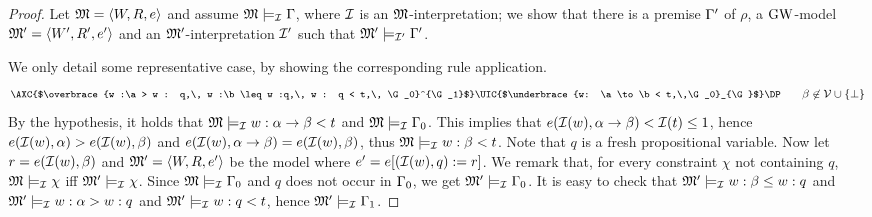 \begin{proof}
  Let $\mathfrak{M}=\langle W,R,e \rangle$ and assume $\mathfrak{M}\models_{\mathcal{I}}\Gamma$, where $\mathcal{I}$
  is an $\mathfrak{M}$-interpretation; we show that there is a premise $\Gamma'$ of
  $\rho$, a $\mbox{$\mathrm{GW}$}$-model $\mathfrak{M}'=\langle W',R',e' \rangle$ and an
  $\mathfrak{M}'$-interpretation $\mathcal{I}'$ such that $\mathfrak{M}'\models_{\mathcal{I}'}\Gamma'$.

  

  We only detail some representative case, by showing the corresponding rule application.
  \[\small
  \AXC{$\overbrace{w :\a > w : q,\,  w :\b \leq w :q,\,  w : q  < t,\,  \G_0}^{\G_1}$}    
  \RightLabel{$\to <$}
  \UIC{$\underbrace{w: \a\to \b < t,\,\G_0}_{\G}$}
  \DP
  \qquad \b\not\in \Vcal\cup\{\bot\}
  \]
  By the hypothesis, it holds that $\mathfrak{M}\models_{\mathcal{I}} w: \alpha\to \beta < t$
  and $\mathfrak{M}\models_{\mathcal{I}} \Gamma_0$.  This implies that $e(\mathcal{I}(w), \alpha\to
  \beta) < \mathcal{I}(t) \leq 1$, hence $e(\mathcal{I}(w),\alpha) > e(\mathcal{I}(w),\beta)$ and
  $e(\mathcal{I}(w),\alpha\to \beta) = e(\mathcal{I}(w),\beta)$, thus $\mathfrak{M}\models_{\mathcal{I}} w:\beta
  < t$. Note that $q$ is a fresh propositional variable. Now let
  $r=e(\mathcal{I}(w),\beta)$ and $\mathfrak{M}'=\langle W,R,e' \rangle$ be the model where
  $e'=e[(\mathcal{I}(w),q):=r]$.  We remark that, for every constraint $\chi$
  not containing $q$, $\mathfrak{M}\models_{\mathcal{I}} \chi$ iff $\mathfrak{M}'\models_{\mathcal{I}}
  \chi$.  Since $\mathfrak{M}\models_{\mathcal{I}} \Gamma_0$ and $q$ does not occur in
  $\Gamma_0$, we get $\mathfrak{M}'\models_{\mathcal{I}} \Gamma_0$.  It is easy to check that
  $\mathfrak{M}'\models_{\mathcal{I}} w :\beta \leq w:q$ and $\mathfrak{M}'\models_{\mathcal{I}} w :\alpha >
  w:q$ and $\mathfrak{M}'\models_{\mathcal{I}} w:q < t$, hence $\mathfrak{M}'\models_{\mathcal{I}}
  \Gamma_1$.


\end{proof}
